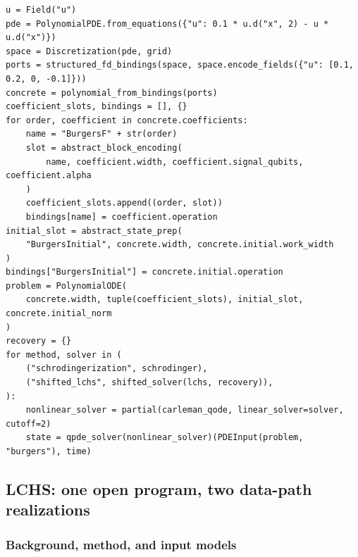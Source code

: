 \begin{lstlisting}[style=pyqpython, caption={Carleman lift of Burgers: open coefficient block-encodings, an open lifted initial state, and a linear solver injected per call (verbatim from case~6 of \texttt{examples/ode\_input\_models.py}; comments translated, artifact serialization elided).}, label={lst:carleman}]
u = Field("u")
pde = PolynomialPDE.from_equations({"u": 0.1 * u.d("x", 2) - u * u.d("x")})
space = Discretization(pde, grid)
ports = structured_fd_bindings(space, space.encode_fields({"u": [0.1, 0.2, 0, -0.1]}))
concrete = polynomial_from_bindings(ports)
coefficient_slots, bindings = [], {}
for order, coefficient in concrete.coefficients:
    name = "BurgersF" + str(order)
    slot = abstract_block_encoding(
        name, coefficient.width, coefficient.signal_qubits, coefficient.alpha
    )
    coefficient_slots.append((order, slot))
    bindings[name] = coefficient.operation
initial_slot = abstract_state_prep(
    "BurgersInitial", concrete.width, concrete.initial.work_width
)
bindings["BurgersInitial"] = concrete.initial.operation
problem = PolynomialODE(
    concrete.width, tuple(coefficient_slots), initial_slot, concrete.initial_norm
)
recovery = {}
for method, solver in (
    ("schrodingerization", schrodinger),
    ("shifted_lchs", shifted_solver(lchs, recovery)),
):
    nonlinear_solver = partial(carleman_qode, linear_solver=solver, cutoff=2)
    state = qpde_solver(nonlinear_solver)(PDEInput(problem, "burgers"), time)
\end{lstlisting}

\subsection{LCHS: one open program, two data-path realizations}
\label{app:lchs}

\subsubsection{Background, method, and input models}
\label{app:lchs-method}

